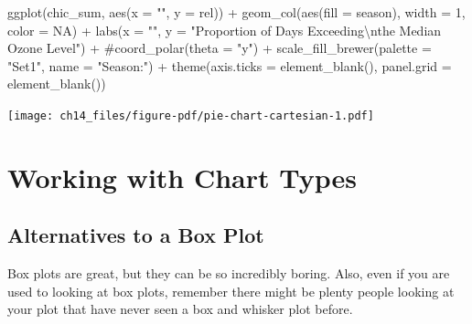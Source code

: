 \documentclass[
  letterpaper,
]{scrbook}
\newenvironment{Shaded}{\begin{snugshade}}{\end{snugshade}}
\newcommand{\AttributeTok}[1]{\textcolor[rgb]{0.40,0.45,0.13}{#1}}
\newcommand{\CommentTok}[1]{\textcolor[rgb]{0.37,0.37,0.37}{#1}}
\newcommand{\ConstantTok}[1]{\textcolor[rgb]{0.56,0.35,0.01}{#1}}
\newcommand{\DecValTok}[1]{\textcolor[rgb]{0.68,0.00,0.00}{#1}}
\newcommand{\FunctionTok}[1]{\textcolor[rgb]{0.28,0.35,0.67}{#1}}
\newcommand{\NormalTok}[1]{\textcolor[rgb]{0.00,0.23,0.31}{#1}}
\newcommand{\SpecialCharTok}[1]{\textcolor[rgb]{0.37,0.37,0.37}{#1}}
\newcommand{\StringTok}[1]{\textcolor[rgb]{0.13,0.47,0.30}{#1}}
\begin{document}
\begin{Shaded}
\begin{Highlighting}[]
\FunctionTok{ggplot}\NormalTok{(chic\_sum, }\FunctionTok{aes}\NormalTok{(}\AttributeTok{x =} \StringTok{""}\NormalTok{, }\AttributeTok{y =}\NormalTok{ rel)) }\SpecialCharTok{+}
  \FunctionTok{geom\_col}\NormalTok{(}\FunctionTok{aes}\NormalTok{(}\AttributeTok{fill =}\NormalTok{ season), }\AttributeTok{width =} \DecValTok{1}\NormalTok{, }\AttributeTok{color =} \ConstantTok{NA}\NormalTok{) }\SpecialCharTok{+}
  \FunctionTok{labs}\NormalTok{(}\AttributeTok{x =} \StringTok{""}\NormalTok{, }\AttributeTok{y =} \StringTok{"Proportion of Days Exceeding}\SpecialCharTok{\textbackslash{}n}\StringTok{the Median Ozone Level"}\NormalTok{) }\SpecialCharTok{+}
  \CommentTok{\#coord\_polar(theta = "y") +}
  \FunctionTok{scale\_fill\_brewer}\NormalTok{(}\AttributeTok{palette =} \StringTok{"Set1"}\NormalTok{, }\AttributeTok{name =} \StringTok{"Season:"}\NormalTok{) }\SpecialCharTok{+}
  \FunctionTok{theme}\NormalTok{(}\AttributeTok{axis.ticks =} \FunctionTok{element\_blank}\NormalTok{(),}
        \AttributeTok{panel.grid =} \FunctionTok{element\_blank}\NormalTok{())}
\end{Highlighting}
\end{Shaded}

\texttt{[image: ch14\_files/figure-pdf/pie-chart-cartesian-1.pdf]}


\chapter{Working with Chart Types}\label{charts}

\section{Alternatives to a Box Plot}\label{alternatives-to-a-box-plot}

Box plots are great, but they can be so incredibly boring. Also, even if
you are used to looking at box plots, remember there might be plenty
people looking at your plot that have never seen a box and whisker plot
before.
\end{document}
